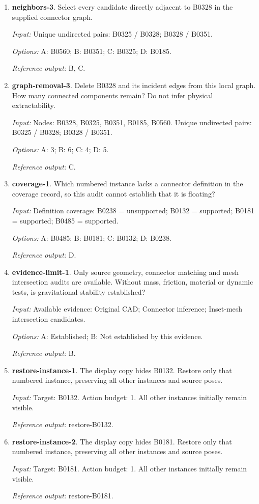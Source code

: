 \begin{enumerate}
\item \textbf{neighbors-3}. Select every candidate directly adjacent to B0328 in the supplied connector graph.\par {\small \textit{Input:} Unique undirected pairs: B0325 / B0328; B0328 / B0351. \par\textit{Options:} A: B0560; B: B0351; C: B0325; D: B0185. \par\textit{Reference output:} B, C.}
\item \textbf{graph-removal-3}. Delete B0328 and its incident edges from this local graph. How many connected components remain? Do not infer physical extractability.\par {\small \textit{Input:} Nodes: B0328, B0325, B0351, B0185, B0560. Unique undirected pairs: B0325 / B0328; B0328 / B0351. \par\textit{Options:} A: 3; B: 6; C: 4; D: 5. \par\textit{Reference output:} C.}
\item \textbf{coverage-1}. Which numbered instance lacks a connector definition in the coverage record, so this audit cannot establish that it is floating?\par {\small \textit{Input:} Definition coverage: B0238 = unsupported; B0132 = supported; B0181 = supported; B0485 = supported. \par\textit{Options:} A: B0485; B: B0181; C: B0132; D: B0238. \par\textit{Reference output:} D.}
\item \textbf{evidence-limit-1}. Only source geometry, connector matching and mesh intersection audits are available. Without mass, friction, material or dynamic tests, is gravitational stability established?\par {\small \textit{Input:} Available evidence: Original CAD; Connector inference; Inset-mesh intersection candidates. \par\textit{Options:} A: Established; B: Not established by this evidence. \par\textit{Reference output:} B.}
\item \textbf{restore-instance-1}. The display copy hides B0132. Restore only that numbered instance, preserving all other instances and source poses.\par {\small \textit{Input:} Target: B0132. Action budget: 1. All other instances initially remain visible. \par\textit{Reference output:} restore-B0132.}
\item \textbf{restore-instance-2}. The display copy hides B0181. Restore only that numbered instance, preserving all other instances and source poses.\par {\small \textit{Input:} Target: B0181. Action budget: 1. All other instances initially remain visible. \par\textit{Reference output:} restore-B0181.}

\end{enumerate}
